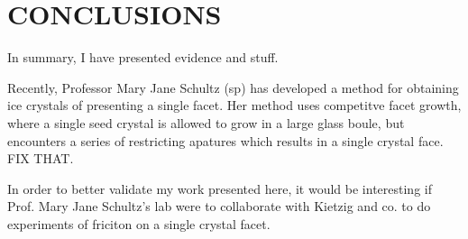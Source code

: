 \chapter{CONCLUSIONS}\label{chap:Concl}
In summary, I have presented evidence and stuff.

Recently, Professor Mary Jane Schultz (sp) has developed a method for
obtaining ice crystals of presenting a single facet. Her method uses
competitve facet growth, where a single seed crystal is allowed to
grow in a large glass boule, but encounters a series of restricting
apatures which results in a single crystal face. FIX THAT.

In order to better validate my work presented here, it would be
interesting if Prof. Mary Jane Schultz's lab were to collaborate with
Kietzig and co. to do experiments of friciton on a single crystal
facet.  
